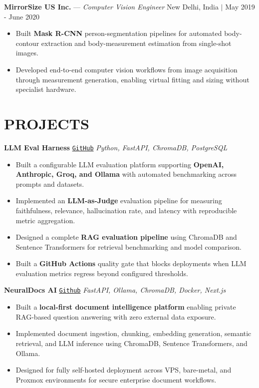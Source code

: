 \documentclass[a4paper,7.5pt]{extarticle}
\begin{document}
\vspace{0pt}
\noindent
\textbf{MirrorSize US Inc.} --- \textit{Computer Vision Engineer} \hfill New Delhi, India $|$ May 2019 - June 2020
\begin{itemize}
    \item Built \textbf{Mask R-CNN} person-segmentation pipelines for automated body-contour extraction and body-measurement estimation from single-shot images.
    \item Developed end-to-end computer vision workflows from image acquisition through measurement generation, enabling virtual fitting and sizing without specialist hardware.
\end{itemize}


\section*{PROJECTS}
\small

\noindent
\textbf{LLM Eval Harness}
\href{https://github.com/kshitijqwerty/llm-eval-harness}{\texttt{GitHub}}
\hfill
\textit{Python, FastAPI, ChromaDB, PostgreSQL}
\begin{itemize}
    \item Built a configurable LLM evaluation platform supporting \textbf{OpenAI, Anthropic, Groq, and Ollama} with automated benchmarking across prompts and datasets.
    \item Implemented an \textbf{LLM-as-Judge} evaluation pipeline for measuring faithfulness, relevance, hallucination rate, and latency with reproducible metric aggregation.
    \item Designed a complete \textbf{RAG evaluation pipeline} using ChromaDB and Sentence Transformers for retrieval benchmarking and model comparison.
    \item Built a \textbf{GitHub Actions} quality gate that blocks deployments when LLM evaluation metrics regress beyond configured thresholds.
\end{itemize}

\vspace{1pt}

\noindent
\textbf{NeuralDocs AI}
\href{https://github.com/kshitijqwerty/analyze-doc-local-llm}{\texttt{Github}}
\hfill
\textit{FastAPI, Ollama, ChromaDB, Docker, Next.js}
\begin{itemize}
    \item Built a \textbf{local-first document intelligence platform} enabling private RAG-based question answering with zero external data exposure.
    \item Implemented document ingestion, chunking, embedding generation, semantic retrieval, and LLM inference using ChromaDB, Sentence Transformers, and Ollama.
    \item Designed for fully self-hosted deployment across VPS, bare-metal, and Proxmox environments for secure enterprise document workflows.
\end{itemize}
\end{document}
